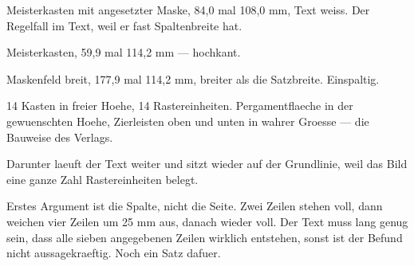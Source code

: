 \documentclass[raster,rasterzeigen]{dsa5latex}
\begin{document}
\begin{dsaMeisterMaske}
Meisterkasten mit angesetzter Maske, 84,0 mal 108,0 mm, Text weiss. Der
Regelfall im Text, weil er fast Spaltenbreite hat.
\end{dsaMeisterMaske}

\begin{dsaMeisterSchmal}
Meisterkasten, 59,9 mal 114,2 mm — hochkant.
\end{dsaMeisterSchmal}

\clearpage
\onecolumn

\begin{dsaMeisterBreit}
Maskenfeld breit, 177,9 mal 114,2 mm, breiter als die Satzbreite. Einspaltig.
\end{dsaMeisterBreit}

\twocolumn

\begin{dsaKastenFrei}{14}
Kasten in freier Hoehe, 14 Rastereinheiten. Pergamentflaeche in der
gewuenschten Hoehe, Zierleisten oben und unten in wahrer Groesse — die
Bauweise des Verlags.
\end{dsaKastenFrei}


\clearpage



Darunter laeuft der Text weiter und sitzt wieder auf der Grundlinie, weil das
Bild eine ganze Zahl Rastereinheiten belegt.




Erstes Argument ist die Spalte, nicht die Seite. Zwei Zeilen stehen voll,
dann weichen vier Zeilen um 25 mm aus, danach wieder voll. Der Text muss lang
genug sein, dass alle sieben angegebenen Zeilen wirklich entstehen, sonst ist
der Befund nicht aussagekraeftig. Noch ein Satz dafuer.

\end{document}
